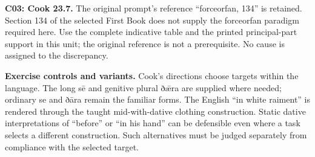 \textbf{C03: Cook 23.7.} The original prompt’s reference “forceorfan, 134” is retained. Section 134 of the selected First Book does not supply the forceorfan paradigm required here. Use the complete indicative table and the printed principal-part support in this unit; the original reference is not a prerequisite. No cause is assigned to the discrepancy.

\textbf{Exercise controls and variants.} Cook’s directions choose targets within the language. The long sē and genitive plural ðǣra are supplied where needed; ordinary se and ðāra remain the familiar forms. The English “in white raiment” is rendered through the taught mid-with-dative clothing construction. Static dative interpretations of “before” or “in his hand” can be defensible even where a task selects a different construction. Such alternatives must be judged separately from compliance with the selected target.

\endgroup

